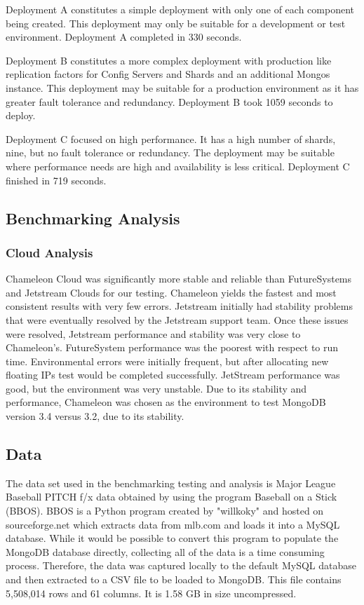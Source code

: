 \documentclass[sigconf]{acmart}
\begin{document}
Deployment A constitutes a simple deployment with only one of each component
being created.  This deployment may only be suitable for a development
or test environment.  Deployment A completed in 330 seconds.

Deployment B constitutes a more complex deployment with production like
replication factors for Config Servers and Shards and an additional
Mongos instance.  This deployment may be suitable for a production
environment as it has greater fault tolerance and redundancy.
Deployment B took 1059 seconds to deploy.

Deployment C focused on high performance.  It has a high number of
shards, nine, but no fault tolerance or redundancy.  The deployment
may be suitable where performance needs are high and availability is
less critical.  Deployment C finished in 719 seconds.



\subsection{Benchmarking Analysis}


\subsubsection{Cloud Analysis}

Chameleon Cloud was significantly more stable and reliable than
FutureSystems and Jetstream Clouds for our testing.  Chameleon yields
the fastest and most consistent results with very few errors.
Jetstream initially had stability problems that were eventually
resolved by the Jetstream support team.  Once these issues were
resolved, Jetstream performance and stability was very close to
Chameleon's.  FutureSystem performance was the poorest with respect to
run time.  Environmental errors were initially frequent, but after
allocating new floating IPs test would be completed successfully.
JetStream performance was good, but the environment was very unstable.
Due to its stability and performance, Chameleon was chosen as the
environment to test MongoDB version 3.4 versus 3.2, due to its
stability.

\subsection{Data}


The data set used in the benchmarking testing and analysis is Major
League Baseball PITCH f/x data obtained by using the program Baseball
on a Stick (BBOS).  BBOS is a Python program created by "willkoky" and
hosted on sourceforge.net which extracts data from mlb.com and loads
it into a MySQL database.  While it would be possible to convert this
program to populate the MongoDB database directly, collecting all of
the data is a time consuming process. Therefore, the data was captured
locally to the default MySQL database and then extracted to a CSV file
to be loaded to MongoDB.  This file contains 5,508,014 rows and 61
columns.  It is 1.58 GB in size uncompressed.
\end{document}
